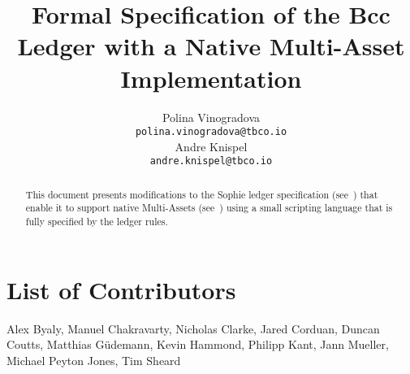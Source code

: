 
\title{Formal Specification of the Bcc Ledger with a Native
Multi-Asset Implementation}
\renewcommand{\thepage}{\arabic{page}}
\setcounter{page}{1}

\author{
   Polina Vinogradova \\ {\small \texttt{polina.vinogradova@tbco.io}} \\
   Andre Knispel \\ {\small \texttt{andre.knispel@tbco.io}} \\
   }

\date{}

\maketitle

\begin{abstract}
This document presents modifications to the Sophie ledger
specification
(see~\cite{sophie_spec}) that enable it to support native
Multi-Assets (see~\cite{multi_currency})
using a small scripting language that is fully specified
by the ledger rules.
\end{abstract}

\section*{List of Contributors}
\label{acknowledgements}

Alex Byaly,
Manuel Chakravarty,
Nicholas Clarke,
Jared Corduan,
Duncan Coutts,
Matthias G\"{u}demann,
Kevin Hammond,
Philipp Kant,
Jann Mueller,
Michael Peyton Jones,
Tim Sheard
